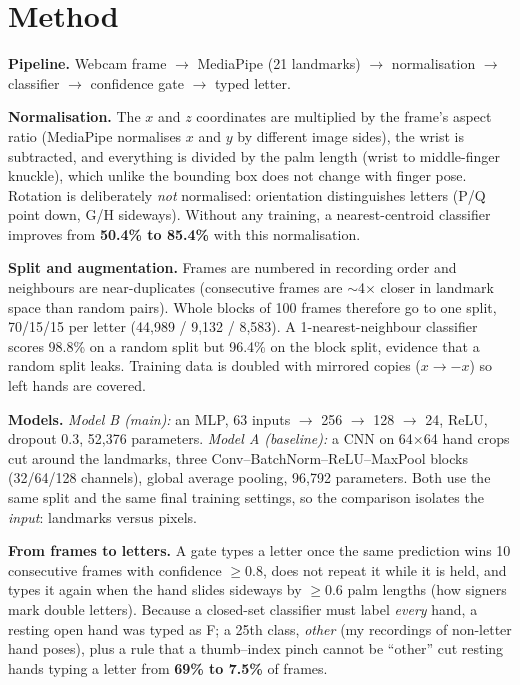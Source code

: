 \documentclass[10pt,a4paper]{article}
\begin{document}
\section{Method}

\textbf{Pipeline.} Webcam frame $\rightarrow$ MediaPipe (21 landmarks) $\rightarrow$
normalisation $\rightarrow$ classifier $\rightarrow$ confidence gate $\rightarrow$ typed letter.

\textbf{Normalisation.} The $x$ and $z$ coordinates are multiplied by the frame's aspect ratio
(MediaPipe normalises $x$ and $y$ by different image sides), the wrist is subtracted, and
everything is divided by the palm length (wrist to middle-finger knuckle), which unlike the
bounding box does not change with finger pose. Rotation is deliberately \emph{not} normalised:
orientation distinguishes letters (P/Q point down, G/H sideways). Without any training, a
nearest-centroid classifier improves from \textbf{50.4\% to 85.4\%} with this normalisation.

\textbf{Split and augmentation.} Frames are numbered in recording order and neighbours are
near-duplicates (consecutive frames are $\sim$4$\times$ closer in landmark space than random
pairs). Whole blocks of 100 frames therefore go to one split, 70/15/15 per letter (44,989 /
9,132 / 8,583). A 1-nearest-neighbour classifier scores 98.8\% on a random split but 96.4\% on
the block split, evidence that a random split leaks. Training data is doubled with mirrored
copies ($x \rightarrow -x$) so left hands are covered.

\textbf{Models.} \emph{Model B (main):} an MLP, 63 inputs $\rightarrow$ 256 $\rightarrow$ 128
$\rightarrow$ 24, ReLU, dropout 0.3, 52,376 parameters. \emph{Model A (baseline):} a CNN on
64$\times$64 hand crops cut around the landmarks, three Conv--BatchNorm--ReLU--MaxPool blocks
(32/64/128 channels), global average pooling, 96,792 parameters. Both use the same split and
the same final training settings, so the comparison isolates the \emph{input}: landmarks
versus pixels.

\textbf{From frames to letters.} A gate types a letter once the same prediction wins 10
consecutive frames with confidence $\geq 0.8$, does not repeat it while it is held, and types
it again when the hand slides sideways by $\geq 0.6$ palm lengths (how signers mark double
letters). Because a closed-set classifier must label \emph{every} hand, a resting open hand was
typed as F; a 25th class, \emph{other} (my recordings of non-letter hand poses), plus a rule
that a thumb--index pinch cannot be ``other'' cut resting hands typing a letter from
\textbf{69\% to 7.5\%} of frames.
\end{document}
